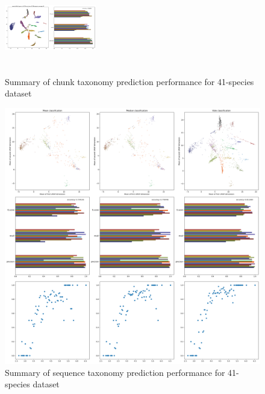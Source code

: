 \documentclass{article}
\begin{document}
\begin{figure}
  \includegraphics[width=4cm,height=4cm]{figures/ar122_r89.genomic.medium/chunks_W4000_S4000/roznet/o256_g4_b32_lr0.001_16bit_A4/summary.png}
  \caption{Summary of chunk taxonomy prediction performance for 41-species dataset}
  \label{fig:summary_roznet_medium_training}
\end{figure}

\begin{figure}
  \includegraphics[width=\linewidth]{new_journal/figures/ar122_r89.genomic.medium/chunks_W4000_S4000/roznet/o256_g4_b32_lr0.001_16bit_A4/summary.aggregated.png}
  \caption{Summary of sequence taxonomy prediction performance for 41-species dataset}
  \label{fig:summary_aggregated_roznet_medium_training}
\end{figure}
\end{document}
